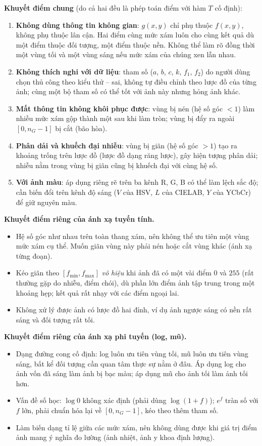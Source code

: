 \textbf{Khuyết điểm chung} (do cả hai đều là phép toán điểm với hàm $T$ cố định):
\begin{enumerate}
    \item \textbf{Không dùng thông tin không gian}: $g(x, y)$ chỉ phụ thuộc $f(x, y)$, không phụ thuộc lân cận. Hai điểm cùng mức xám luôn cho cùng kết quả dù một điểm thuộc đối tượng, một điểm thuộc nền. Không thể làm rõ đồng thời một vùng tối và một vùng sáng nếu mức xám của chúng xen lẫn nhau.
    \item \textbf{Không thích nghi với dữ liệu}: tham số ($a$, $b$, $c$, $k$, $f_1$, $f_2$) do người dùng chọn thủ công theo kiểu thử -- sai, không tự điều chỉnh theo lược đồ của từng ảnh; cùng một bộ tham số có thể tốt với ảnh này nhưng hỏng ảnh khác.
    \item \textbf{Mất thông tin không khôi phục được}: vùng bị nén (hệ số góc $< 1$) làm nhiều mức xám gộp thành một sau khi làm tròn; vùng bị đẩy ra ngoài $[0, n_G - 1]$ bị cắt (bão hòa).
    \item \textbf{Phân dải và khuếch đại nhiễu}: vùng bị giãn (hệ số góc $> 1$) tạo ra khoảng trống trên lược đồ (lược đồ dạng răng lược), gây hiện tượng phân dải; nhiễu nằm trong vùng bị giãn cũng bị khuếch đại với cùng hệ số.
    \item \textbf{Với ảnh màu}: áp dụng riêng rẽ trên ba kênh R, G, B có thể làm lệch sắc độ; cần biến đổi trên kênh độ sáng ($V$ của HSV, $L$ của CIELAB, $Y$ của YCbCr) để giữ nguyên màu.
\end{enumerate}

\textbf{Khuyết điểm riêng của ánh xạ tuyến tính.}
\begin{itemize}
    \item Hệ số góc như nhau trên toàn thang xám, nên không thể ưu tiên một vùng mức xám cụ thể. Muốn giãn vùng này phải nén hoặc cắt vùng khác (ánh xạ từng đoạn).
    \item Kéo giãn theo $[f_{\min}, f_{\max}]$ \emph{vô hiệu} khi ảnh đã có một vài điểm $0$ và $255$ (rất thường gặp do nhiễu, điểm chói), dù phần lớn điểm ảnh tập trung trong một khoảng hẹp; kết quả rất nhạy với các điểm ngoại lai.
    \item Không xử lý được ảnh có lược đồ hai đỉnh, ví dụ ảnh ngược sáng có nền rất sáng và đối tượng rất tối.
\end{itemize}

\textbf{Khuyết điểm riêng của ánh xạ phi tuyến (log, mũ).}
\begin{itemize}
    \item Dạng đường cong cố định: log luôn ưu tiên vùng tối, mũ luôn ưu tiên vùng sáng, bất kể đối tượng cần quan tâm thực sự nằm ở đâu. Áp dụng log cho ảnh vốn đã sáng làm ảnh bị bạc màu; áp dụng mũ cho ảnh tối làm ảnh tối hơn.
    \item Vấn đề số học: $\log 0$ không xác định (phải dùng $\log(1 + f)$); $e^{f}$ tràn số với $f$ lớn, phải chuẩn hóa lại về $[0, n_G - 1]$, kéo theo thêm tham số.
    \item Làm biến dạng tỉ lệ giữa các mức xám, nên không dùng được khi giá trị điểm ảnh mang ý nghĩa đo lường (ảnh nhiệt, ảnh y khoa định lượng).
\end{itemize}

